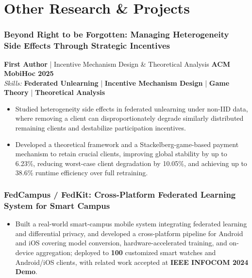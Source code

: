 \documentclass[10pt,a4paper]{article}
\begin{document}
\section*{\color{sectioncolor}Other Research \& Projects}
    \subsubsection*{\color{itemcolor}Beyond Right to be Forgotten: Managing Heterogeneity Side Effects Through Strategic Incentives}
    \noindent\textbf{\color{sectioncolor}First Author} | Incentive Mechanism Design \& Theoretical Analysis \hfill \color{accentcolor}\textbf{ACM MobiHoc 2025} \\
    \noindent\textit{\color{graytext}Skills:} \textbf{Federated Unlearning} | \textbf{Incentive Mechanism Design} | \textbf{Game Theory} | \textbf{Theoretical Analysis}
    \begin{itemize}[leftmargin=*, label=\textcolor{accentcolor}{\textbullet}, itemsep=0.2em]
        \item Studied heterogeneity side effects in federated unlearning under non-IID data, where removing a client can disproportionately degrade similarly distributed remaining clients and destabilize participation incentives.
        \item Developed a theoretical framework and a Stackelberg-game-based payment mechanism to retain crucial clients, improving global stability by up to 6.23\%, reducing worst-case client degradation by 10.05\%, and achieving up to 38.6\% runtime efficiency over full retraining.
    \end{itemize}
  
    \subsubsection*{\color{itemcolor}FedCampus / FedKit: Cross-Platform Federated Learning System for Smart Campus}
    \begin{itemize}[leftmargin=*, label=\textcolor{accentcolor}{\textbullet}, itemsep=0.2em]
        \item Built a real-world smart-campus mobile system integrating federated learning and differential privacy, and developed a cross-platform pipeline for Android and iOS covering model conversion, hardware-accelerated training, and on-device aggregation; deployed to \textbf{100} customized smart watches and Android/iOS clients, with related work accepted at \textbf{IEEE INFOCOM 2024 Demo}.
    \end{itemize}
\end{document}
